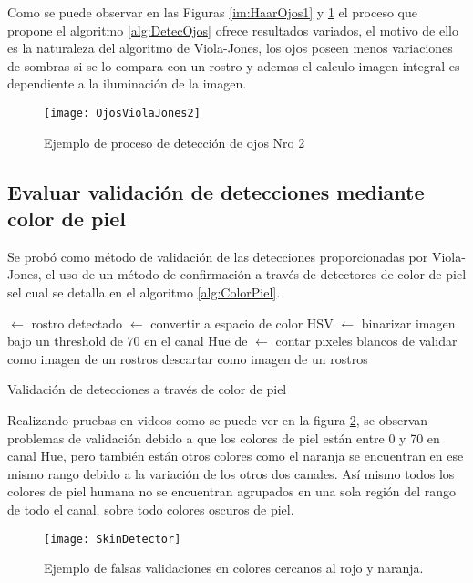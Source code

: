 Como se puede observar en las Figuras \ref{im:HaarOjos1} y \ref{im:HaarOjos2} el proceso que propone el algoritmo \ref{alg:DetecOjos} ofrece resultados variados, el motivo de ello es la naturaleza del algoritmo de Viola-Jones, los ojos poseen menos variaciones de sombras si se lo compara con un rostro y ademas el calculo imagen integral es dependiente a la iluminación de la imagen.

\begin{figure}[h]
	\centering
    \texttt{[image: OjosViolaJones2]}
    \caption{Ejemplo de proceso de detección de ojos Nro 2}
    \label{im:HaarOjos2}
\end{figure}

\subsection{Evaluar validación de detecciones mediante color de piel}
Se probó como método de validación de las detecciones proporcionadas por Viola-Jones, el uso de un método de confirmación a través de detectores de color de piel sel cual se detalla en el algoritmo \ref{alg:ColorPiel}.

\begin{algorithm}[h]
\label{alg:ColorPiel}
 $\gets$ rostro detectado\;
 $\gets$ convertir  a espacio de color HSV\;
 $\gets$ binarizar imagen bajo un threshold de 70 en el canal Hue de \;
 $\gets$ contar pixeles blancos de \;
{
	validar  como imagen de un rostros\;
}
{
	descartar  como imagen de un rostros\;
}
\caption{Validación de detecciones a través de color de piel}
\end{algorithm}

Realizando pruebas en videos como se puede ver en la figura \ref{im:skinDetector}, se observan problemas de validación debido a que los colores de piel están entre 0 y 70 en canal Hue, pero también están otros colores como el naranja se encuentran en ese mismo rango debido a la variación de los otros dos canales. Así mismo todos los colores de piel humana no se encuentran agrupados en una sola región del rango de todo el canal, sobre todo colores oscuros de piel.
\begin{figure}[h]
	\centering
    \texttt{[image: SkinDetector]}
    \caption{Ejemplo de falsas validaciones en colores cercanos al rojo y naranja.}
    \label{im:skinDetector}
\end{figure}

